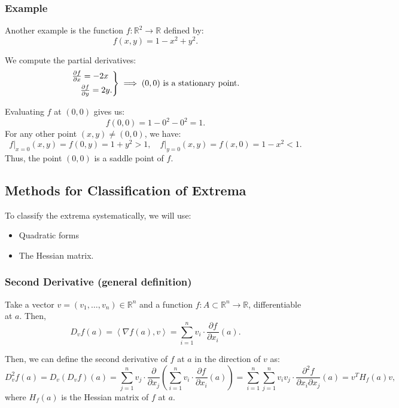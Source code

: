\documentclass[11pt]{article}
\newcommand{\inner}[2]{\left\langle #1, #2 \right\rangle}
\begin{document}
\subsubsection*{Example}
Another example is the function \(f : \mathbb{R}^2 \to \mathbb{R}\) defined by:
\[ f(x, y) = 1 - x^2 + y^2. \]

We compute the partial derivatives: 
\[\begin{rcases}
\frac{\partial f}{\partial x} = -2x \\
\quad \frac{\partial f}{\partial y} = 2y.
\end{rcases} \implies (0, 0) \text{ is a stationary point.}\]

Evaluating \(f\) at \((0, 0)\) gives us:
\[f(0, 0) = 1 - 0^2 - 0^2 = 1.\]
For any other point \((x, y) \neq (0, 0)\), we have:
\[f \big|_{x = 0} (x, y) = f(0, y) = 1 + y^2 > 1, \quad f \big|_{y = 0} (x, y) = f(x, 0) = 1 - x^2 < 1.\]
Thus, the point \((0, 0)\) is a saddle point of \(f\).

\pagebreak 

\subsection{Methods for Classification of Extrema}
To classify the extrema systematically, we will use:
\begin{itemize}
    \item Quadratic forms
    \item The Hessian matrix.
\end{itemize}

\subsubsection{Second Derivative (general definition)}
Take a vector \(v = (v_1, \dots, v_n) \in \mathbb{R}^n\) and a function \(f : A \subset \mathbb{R}^n \to \mathbb{R}\), differentiable at \(a\). Then,
\[D_v f(a) = \inner{\nabla f(a)}{v} = \sum_{i=1}^n v_i \cdot \frac{\partial f}{\partial x_i}(a).\]

Then, we can define the second derivative of \(f\) at \(a\) in the direction of \(v\) as:
\[D^2_v f(a) = D_v (D_v f)(a) = \sum_{j=1}^n v_j \cdot \frac{\partial}{\partial x_j} \left( \sum_{i=1}^n v_i \cdot \frac{\partial f}{\partial x_i}(a) \right) = \sum_{i=1}^n \sum_{j=1}^n v_i v_j \cdot \frac{\partial^2 f}{\partial x_i \partial x_j}(a) = v^T H_f(a) v,\]
where \(H_f(a)\) is the Hessian matrix of \(f\) at \(a\).

\begin{center}
\end{center}
\end{document}
